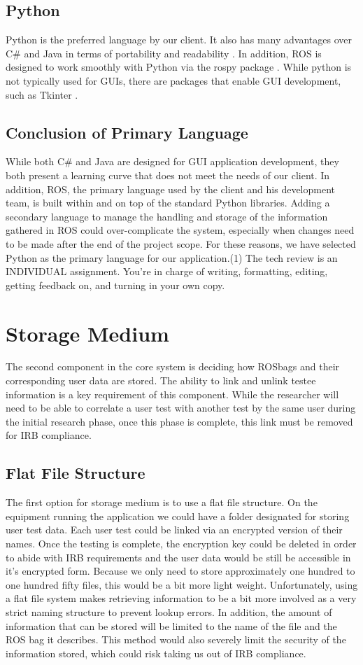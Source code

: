 \documentclass[onecolumn, draftclsnofoot,10pt, compsoc]{report}
\begin{document}
\subsection{Python}
Python is the preferred language by our client. It also has many advantages over C\# and Java in terms of portability and readability \cite{JavaVPython}. In addition, ROS is designed to work smoothly with Python via the rospy package \cite{ROSpy}. While python is not typically used for GUIs, there are packages that enable GUI development, such as Tkinter \cite{Tkinter}. 
\subsection{Conclusion of Primary Language}
While both C\# and Java are designed for GUI application development, they both present a learning curve that does not meet the needs of our client. In addition, ROS, the primary language used by the client and his development team, is built within and on top of the standard Python libraries. Adding a secondary language to manage the handling and storage of the information gathered in ROS could over-complicate the system, especially when changes need to be made after the end of the project scope. For these reasons, we have selected Python as the primary language for our application.(1)     The tech review is an INDIVIDUAL assignment. You’re in charge of writing, formatting, editing, getting feedback on, and turning in your own copy.  



\section{Storage Medium}
The second component in the core system is deciding how ROSbags and their corresponding user data are stored. The ability to link and unlink testee information is a key requirement of this component. While the researcher will need to be able to correlate a user test with another test by the same user during the initial research phase, once this phase is complete, this link must be removed for IRB compliance. 
\subsection{Flat File Structure}
The first option for storage medium is to use a flat file structure. On the equipment running the application we could have a folder designated for storing user test data. Each user test could be linked via an encrypted version of their names. Once the testing is complete, the encryption key could be deleted in order to abide with IRB requirements and the user data would be still be accessible in it's encrypted form. Because we only need to store approximately one hundred to one hundred fifty files, this would be a bit more light weight. Unfortunately, using a flat file system makes retrieving information to be a bit more involved as a very strict naming structure to prevent lookup errors. In addition, the amount of information that can be stored will be limited to the name of the file and the ROS bag it describes. This method would also severely limit the security of the information stored, which could risk taking us out of IRB compliance. 
\end{document}

